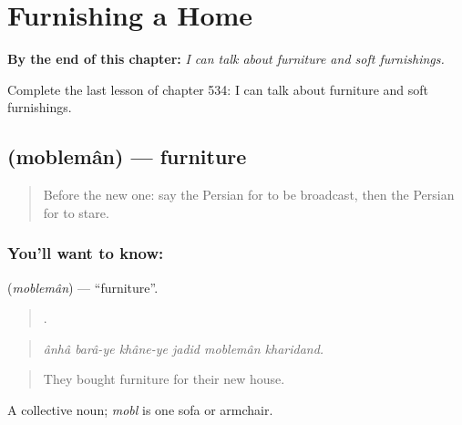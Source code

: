 
\chapter{Furnishing a Home}
\label{ch:fa-furnishing-a-home}

\begin{chapteropening}
\textbf{By the end of this chapter:} \emph{I can talk about furniture and soft furnishings.}

Complete the last lesson of chapter 534: I can talk about furniture and soft furnishings.
\end{chapteropening}

\section[\texorpdfstring{\fa{مبلمان} (moblemân)}{مبلمان (moblemân)}]{ (moblemân) — furniture}

\label{lesson:FA-C534-mobleman}



\begin{quote}
Before the new one: say the Persian for to be broadcast, then the Persian for to stare.
\end{quote}

\subsection*{You'll want to know: }
\textbf{} (\emph{moblemân}) — \textquotedblleft{}furniture\textquotedblright{}.

\begin{quote}
     .
\end{quote}

\begin{quote}
\emph{ânhâ barâ-ye khâne-ye jadid moblemân kharidand.}
\end{quote}

\begin{quote}
They bought furniture for their new house.
\end{quote}

A collective noun; \emph{mobl} is one sofa or armchair.

